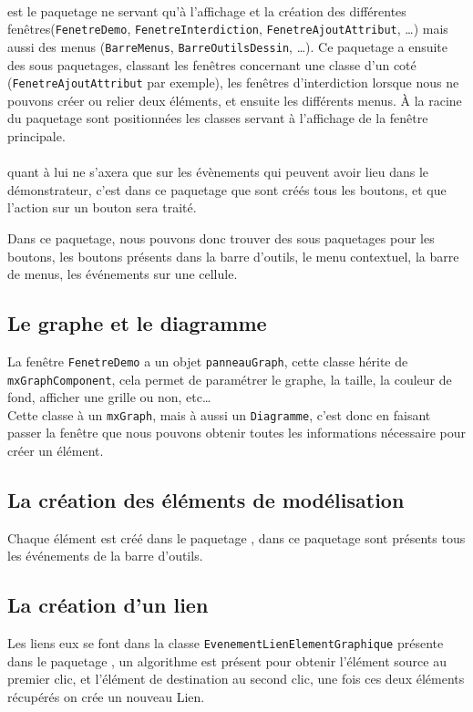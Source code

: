 \documentclass[12pt,a4paper,oneside]{book}
\begin{document}
	\paragraph{}	

	 est le paquetage ne servant qu'à l'affichage et la création des différentes fenêtres(\texttt{FenetreDemo}, \texttt{FenetreInterdiction}, \texttt{FenetreAjoutAttribut}, \ldots) mais aussi des menus (\texttt{BarreMenus}, \texttt{BarreOutilsDessin}, \ldots).
	Ce paquetage a ensuite des sous paquetages, classant les fenêtres concernant une classe d'un coté (\texttt{FenetreAjoutAttribut} par exemple), les fenêtres d'interdiction
	lorsque nous ne pouvons créer ou relier deux éléments, et ensuite les différents menus. À la racine du paquetage  sont positionnées 
	les classes servant à l'affichage de la fenêtre principale.
	\paragraph{}
	 quant à lui ne s'axera que sur les évènements qui peuvent avoir lieu dans le démonstrateur, c'est dans ce paquetage que sont créés
	tous les boutons, et que l'action sur un bouton sera traité.

	Dans ce paquetage, nous pouvons donc trouver des sous paquetages pour les boutons, les boutons présents dans la barre d'outils, le menu contextuel, la barre de menus, les
	événements sur une cellule.

	\subsection{Le graphe et le diagramme}
	La fenêtre \texttt{FenetreDemo} a un objet \texttt{panneauGraph}, cette classe hérite de \texttt{mxGraphComponent}, cela permet de paramétrer le graphe, la taille, la couleur de fond, afficher une grille ou non, etc\ldots \\
	Cette classe à un \texttt{mxGraph}, mais à aussi un \texttt{Diagramme}, c'est donc en faisant passer la fenêtre que nous pouvons obtenir toutes les informations
	nécessaire pour créer un élément. 
	\subsection{La création des éléments de modélisation}
	Chaque élément est créé dans le paquetage , dans ce paquetage sont présents tous les événements de la barre d'outils. 
	\subsection{La création d'un lien}
	Les liens eux se font dans la classe \texttt{EvenementLienElementGraphique} présente dans le paquetage , un algorithme
	est présent pour obtenir l'élément source au premier clic, et l'élément de destination au second clic, une fois ces deux éléments récupérés on crée
	un nouveau Lien.
\end{document}
